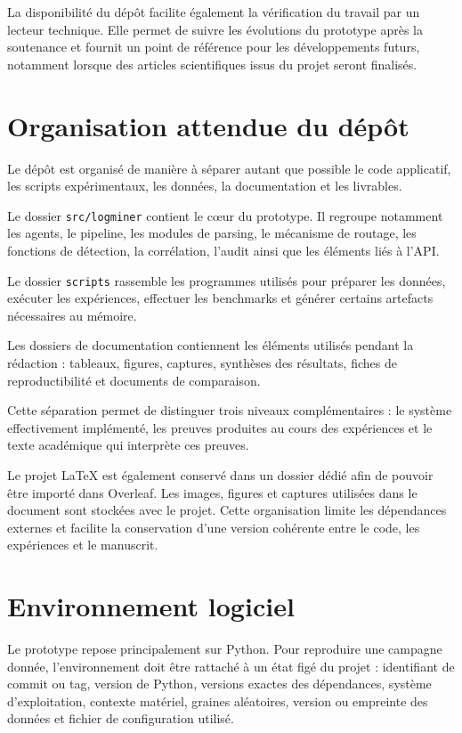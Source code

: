 La disponibilité du dépôt facilite également la vérification du travail par un lecteur technique. Elle permet de suivre les évolutions du prototype après la soutenance et fournit un point de référence pour les développements futurs, notamment lorsque des articles scientifiques issus du projet seront finalisés.

\section{Organisation attendue du dépôt}

Le dépôt est organisé de manière à séparer autant que possible le code applicatif, les scripts expérimentaux, les données, la documentation et les livrables.

Le dossier \texttt{src/logminer} contient le cœur du prototype. Il regroupe notamment les agents, le pipeline, les modules de parsing, le mécanisme de routage, les fonctions de détection, la corrélation, l'audit ainsi que les éléments liés à l'API.

Le dossier \texttt{scripts} rassemble les programmes utilisés pour préparer les données, exécuter les expériences, effectuer les benchmarks et générer certains artefacts nécessaires au mémoire.

Les dossiers de documentation contiennent les éléments utilisés pendant la rédaction : tableaux, figures, captures, synthèses des résultats, fiches de reproductibilité et documents de comparaison.

Cette séparation permet de distinguer trois niveaux complémentaires : le système effectivement implémenté, les preuves produites au cours des expériences et le texte académique qui interprète ces preuves.

Le projet LaTeX est également conservé dans un dossier dédié afin de pouvoir être importé dans Overleaf. Les images, figures et captures utilisées dans le document sont stockées avec le projet. Cette organisation limite les dépendances externes et facilite la conservation d'une version cohérente entre le code, les expériences et le manuscrit.

\section{Environnement logiciel}

Le prototype repose principalement sur Python. Pour reproduire une campagne donnée, l'environnement doit être rattaché à un état figé du projet : identifiant de commit ou tag, version de Python, versions exactes des dépendances, système d'exploitation, contexte matériel, graines aléatoires, version ou empreinte des données et fichier de configuration utilisé.

